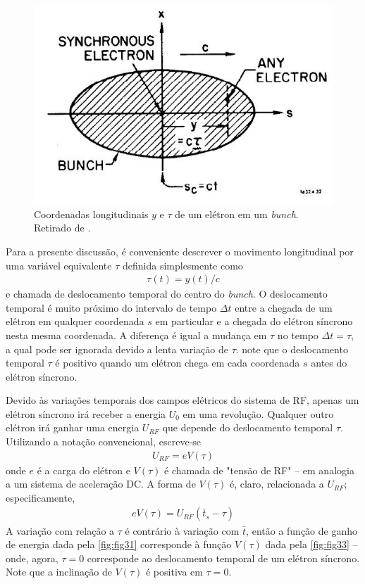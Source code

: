 \begin{figure}[!htb]
	\centering
	\includegraphics[width=0.6\linewidth]{./Figuras/fig32.jpeg}
	\caption{Coordenadas longitudinais $y$ e $\tau$ de um elétron em um \textit{bunch}. Retirado de \cite{sands1970physics}.}
	\label{fig:fig32}
\end{figure}

Para a presente discussão, é conveniente descrever o movimento longitudinal por uma variável equivalente $\tau$ definida simplesmente como
\begin{align}
	\tau(t) = y(t)/c
\end{align}
e chamada de deslocamento temporal do centro do \textit{bunch}. O deslocamento temporal é muito próximo do intervalo de tempo $\Delta t$ entre a chegada de um elétron em qualquer coordenada $s$ em particular e a chegada do elétron síncrono nesta mesma coordenada. A diferença é igual a mudança em $\tau$ no tempo $\Delta t = \tau$, a qual pode ser ignorada devido a lenta variação de $\tau$. note que o deslocamento temporal $\tau$ é positivo quando um elétron chega em cada coordenada $s$ antes do elétron síncrono.

Devido às variações temporais dos campos elétricos do sistema de RF, apenas um elétron síncrono irá receber a energia $U_0$ em uma revolução. Qualquer outro elétron irá ganhar uma energia $U_{RF}$ que depende do deslocamento temporal $\tau$. Utilizando a notação convencional, escreve-se
\begin{align}
	U_{RF} = eV(\tau)
\end{align}
onde $e$ é a carga do elétron e $V(\tau)$ é chamada de "tensão de RF" -- em analogia a um sistema de aceleração DC. A forma de $V(\tau)$ é, claro, relacionada a $U_{RF}$; especificamente,
\begin{align}
	eV(\tau) = U_{RF}(\bar{t}_s - \tau)
\end{align}
A variação com relação a $\tau$ é contrário à variação com $\bar{t}$, então a função de ganho de energia dada pela \autoref{fig:fig31} corresponde à função $V(\tau)$ dada pela \autoref{fig:fig33} -- onde, agora, $\tau=0$ corresponde ao deslocamento temporal de um elétron síncrono. Note que a inclinação de $V(\tau)$ é positiva em $\tau=0$.

